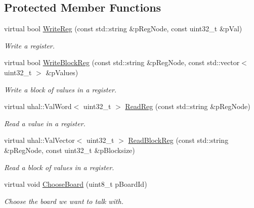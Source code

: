 \subsection*{Protected Member Functions}
\begin{DoxyCompactItemize}
\item 
virtual bool \hyperlink{class_ph2___hw_interface_1_1_reg_manager_a31174516fef6706c88c3f59dd93e4fdf}{Write\-Reg} (const std\-::string \&p\-Reg\-Node, const uint32\-\_\-t \&p\-Val)
\begin{DoxyCompactList}\small\item\em Write a register. \end{DoxyCompactList}\item 
virtual bool \hyperlink{class_ph2___hw_interface_1_1_reg_manager_a888f5cccb05daa28896cf622abfdcbd6}{Write\-Block\-Reg} (const std\-::string \&p\-Reg\-Node, const std\-::vector$<$ uint32\-\_\-t $>$ \&p\-Values)
\begin{DoxyCompactList}\small\item\em Write a block of values in a register. \end{DoxyCompactList}\item 
virtual uhal\-::\-Val\-Word$<$ uint32\-\_\-t $>$ \hyperlink{class_ph2___hw_interface_1_1_reg_manager_a077e0a18592206365150680213345112}{Read\-Reg} (const std\-::string \&p\-Reg\-Node)
\begin{DoxyCompactList}\small\item\em Read a value in a register. \end{DoxyCompactList}\item 
virtual uhal\-::\-Val\-Vector$<$ uint32\-\_\-t $>$ \hyperlink{class_ph2___hw_interface_1_1_reg_manager_a6481c211d27badc409ff0e7af20575e4}{Read\-Block\-Reg} (const std\-::string \&p\-Reg\-Node, const uint32\-\_\-t \&p\-Blocksize)
\begin{DoxyCompactList}\small\item\em Read a block of values in a register. \end{DoxyCompactList}\item 
virtual void \hyperlink{class_ph2___hw_interface_1_1_reg_manager_a20c502bcad5115c6ae16d4d356b72f0c}{Choose\-Board} (uint8\-\_\-t p\-Board\-Id)
\begin{DoxyCompactList}\small\item\em Choose the board we want to talk with. \end{DoxyCompactList}\end{DoxyCompactItemize}
